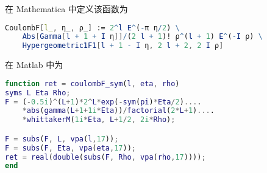 
在 Mathematica 中定义该函数为
\begin{lstlisting}[language=Mathematica]
CoulombF[l_, η_, ρ_] := 2^l E^(-π η/2) \
    Abs[Gamma[l + 1 + I η]]/(2 l + 1)! ρ^(l + 1) E^(-I ρ) \
    Hypergeometric1F1[l + 1 - I η, 2 l + 2, 2 I ρ]
\end{lstlisting}

在 Matlab 中为
\begin{lstlisting}[language=matlab]
% rho 支持数组
function ret = coulombF_sym(l, eta, rho)
syms L Eta Rho;
F = (-0.5i)^(L+1)*2^L*exp(-sym(pi)*Eta/2)....
    *abs(gamma(L+1+1i*Eta))/factorial(2*L+1)....
    *whittakerM(1i*Eta, L+1/2, 2i*Rho);

F = subs(F, L, vpa(l,17));
F = subs(F, Eta, vpa(eta,17));
ret = real(double(subs(F, Rho, vpa(rho,17))));
end
\end{lstlisting}
